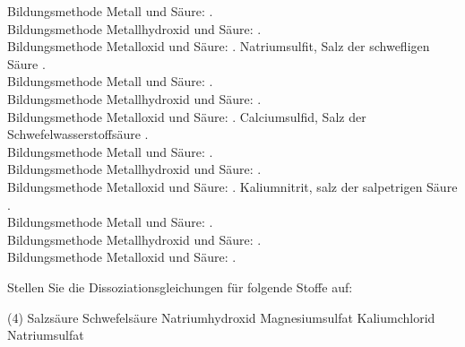 \documentclass[DIV11]{scrartcl}
\begin{document}
\begin{solution}[name={Säuren, Basen und Salze I}]
\begin{tasks}
    Bildungsmethode Metall und Säure: .\\
    Bildungsmethode Metallhydroxid und Säure: .\\
    Bildungsmethode Metalloxid und Säure: .
  \task Natriumsulfit, Salz der schwefligen Säure .\\
    Bildungsmethode Metall und Säure: .\\
    Bildungsmethode Metallhydroxid und Säure: .\\
    Bildungsmethode Metalloxid und Säure: .
  \task Calciumsulfid, Salz der Schwefelwasserstoffsäure .\\
    Bildungsmethode Metall und Säure: .\\
    Bildungsmethode Metallhydroxid und Säure: .\\
    Bildungsmethode Metalloxid und Säure: .
  \task Kaliumnitrit, salz der salpetrigen Säure .\\
    Bildungsmethode Metall und Säure: .\\
    Bildungsmethode Metallhydroxid und Säure: .\\
    Bildungsmethode Metalloxid und Säure: .
\end{tasks}
\end{solution}

\begin{question}[name={Säuren, Basen und Salze II}]
Stellen Sie die Dissoziationsgleichungen für folgende Stoffe auf:
\begin{tasks}(4)
  \task Salzsäure
  \task Schwefelsäure
  \task Natriumhydroxid
  \task Magnesiumsulfat
  \task Kaliumchlorid
  \task Natriumsulfat
\end{tasks}
\end{question}
\begin{solution}[name={Säuren, Basen und Salze II}]
\begin{tasks}
  \task {}
  \task {}
  \task {}
  \task {}
  \task {}
  \task {}
\end{tasks}
\end{solution}
\end{document}

